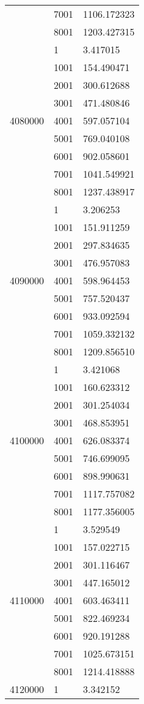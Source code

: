 \begin{table}[htb!]
\begin{tabular}{lll}
 & 7001 & 1106.172323 \\
 & 8001 & 1203.427315 \\
\multirow[c]{9}{*}{4080000} & 1 & 3.417015 \\
 & 1001 & 154.490471 \\
 & 2001 & 300.612688 \\
 & 3001 & 471.480846 \\
 & 4001 & 597.057104 \\
 & 5001 & 769.040108 \\
 & 6001 & 902.058601 \\
 & 7001 & 1041.549921 \\
 & 8001 & 1237.438917 \\
\multirow[c]{9}{*}{4090000} & 1 & 3.206253 \\
 & 1001 & 151.911259 \\
 & 2001 & 297.834635 \\
 & 3001 & 476.957083 \\
 & 4001 & 598.964453 \\
 & 5001 & 757.520437 \\
 & 6001 & 933.092594 \\
 & 7001 & 1059.332132 \\
 & 8001 & 1209.856510 \\
\multirow[c]{9}{*}{4100000} & 1 & 3.421068 \\
 & 1001 & 160.623312 \\
 & 2001 & 301.254034 \\
 & 3001 & 468.853951 \\
 & 4001 & 626.083374 \\
 & 5001 & 746.699095 \\
 & 6001 & 898.990631 \\
 & 7001 & 1117.757082 \\
 & 8001 & 1177.356005 \\
\multirow[c]{9}{*}{4110000} & 1 & 3.529549 \\
 & 1001 & 157.022715 \\
 & 2001 & 301.116467 \\
 & 3001 & 447.165012 \\
 & 4001 & 603.463411 \\
 & 5001 & 822.469234 \\
 & 6001 & 920.191288 \\
 & 7001 & 1025.673151 \\
 & 8001 & 1214.418888 \\
\multirow[c]{9}{*}{4120000} & 1 & 3.342152 \\

\end{tabular}
\end{table}
